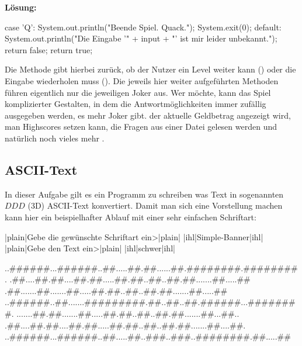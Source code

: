 \documentclass[table]{sopra-base}
\makeatletter
\newenvironment{solution}{\null\par\noindent\textbf{\textcolor{sob@col@uulm@cs}{Lösung:}}\newline\bgroup\color{black}\slshape\ignorespaces}{\egroup}
\makeatother
\begin{document}
\begin{solution}
\begin{java}[firstnumber=106,add to literate={A34_Question}{{\solGet{keywordC}{A34\_Question}}}{11}]
{{        case 'Q':
            System.out.println("Beende Spiel. Quack.");
            System.exit(0);
        default:
            System.out.println("Die Eingabe '" + input +
                               "' ist mir leider unbekannt.");
            return false;
    }
    return true;
}
\end{java}
    Die Methode gibt hierbei zurück, ob der Nutzer ein Level weiter kann () oder die Eingabe wiederholen muss (). Die jeweils hier weiter aufgeführten Methoden führen eigentlich nur die jeweiligen Joker aus. Wer möchte, kann das Spiel komplizierter Gestalten, in dem die Antwortmöglichkeiten immer zufällig ausgegeben werden, es mehr Joker gibt. der aktuelle Geldbetrag angezeigt wird, man Highscores setzen kann, die Fragen aus einer Datei gelesen werden und natürlich noch vieles mehr \Laughey.
\end{solution}


\subsection{ASCII-Text}

In dieser Aufgabe gilt es ein Programm zu schreiben was Text in sogenannten $DDD$ (3D) ASCII-Text konvertiert. Damit man sich
eine Vorstellung machen kann hier ein beispielhafter Ablauf mit einer sehr einfachen Schriftart:
\begin{plainjava}
|plain|Gebe die gewünschte Schriftart ein>|plain| |ihl|Simple-Banner|ihl|
|plain|Gebe den Text ein>|plain| |ihl|schwer|ihl|

..######...######..##.....##.##......##.########.########.
.##....##.##....##.##.....##.##..##..##.##.......##.....##
.##.......##.......##.....##.##..##..##.##.......##.....##
..######..##.......#########.##..##..##.######...########.
.......##.##.......##.....##.##..##..##.##.......##...##..
.##....##.##....##.##.....##.##..##..##.##.......##....##.
..######...######..##.....##..###..###..########.##.....##
\end{plainjava}
\end{document}
